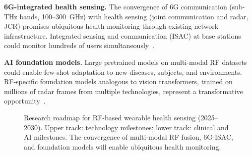 \documentclass[journal,twoside]{IEEEtran}
\begin{document}
\textbf{6G-integrated health sensing.} The convergence of 6G communication (sub-THz bands, 100--300~GHz) with health sensing (joint communication and radar, JCR) promises ubiquitous health monitoring through existing network infrastructure. Integrated sensing and communication (ISAC) at base stations could monitor hundreds of users simultaneously~\cite{ref_6g_health2024}.

\textbf{AI foundation models.} Large pretrained models on multi-modal RF datasets could enable few-shot adaptation to new diseases, subjects, and environments. RF-specific foundation models analogous to vision transformers, trained on millions of radar frames from multiple technologies, represent a transformative opportunity~\cite{ref_foundation2025}.

\begin{figure}[!t]
\centering
{}
\caption{Research roadmap for RF-based wearable health sensing (2025--2030). Upper track: technology milestones; lower track: clinical and AI milestones. The convergence of multi-modal RF fusion, 6G-ISAC, and foundation models will enable ubiquitous health monitoring.}
\label{fig:roadmap}
\end{figure}
\end{document}
